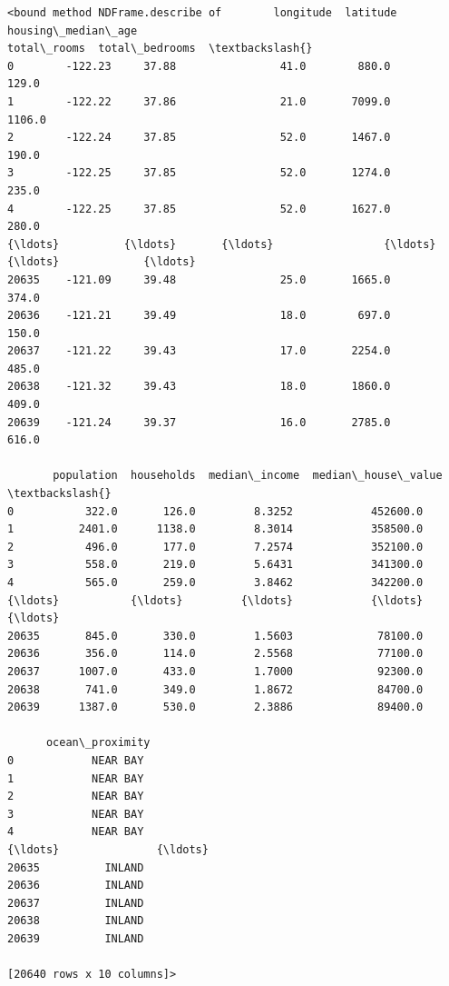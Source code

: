 \documentclass[11pt]{article}
\makeatletter
\newcommand{\boxspacing}{\kern\kvtcb@left@rule\kern\kvtcb@boxsep}
\newcommand{\prompt}[4]{
        {\ttfamily\llap{{\color{#2}[#3]:\hspace{3pt}#4}}\vspace{-\baselineskip}}
    }
\makeatother
\begin{document}
            \begin{tcolorbox}[breakable, size=fbox, boxrule=.5pt, pad at break*=1mm, opacityfill=0]
\prompt{Out}{outcolor}{10}{\boxspacing}
\begin{Verbatim}[commandchars=\\\{\}]
<bound method NDFrame.describe of        longitude  latitude  housing\_median\_age
total\_rooms  total\_bedrooms  \textbackslash{}
0        -122.23     37.88                41.0        880.0           129.0
1        -122.22     37.86                21.0       7099.0          1106.0
2        -122.24     37.85                52.0       1467.0           190.0
3        -122.25     37.85                52.0       1274.0           235.0
4        -122.25     37.85                52.0       1627.0           280.0
{\ldots}          {\ldots}       {\ldots}                 {\ldots}          {\ldots}             {\ldots}
20635    -121.09     39.48                25.0       1665.0           374.0
20636    -121.21     39.49                18.0        697.0           150.0
20637    -121.22     39.43                17.0       2254.0           485.0
20638    -121.32     39.43                18.0       1860.0           409.0
20639    -121.24     39.37                16.0       2785.0           616.0

       population  households  median\_income  median\_house\_value  \textbackslash{}
0           322.0       126.0         8.3252            452600.0
1          2401.0      1138.0         8.3014            358500.0
2           496.0       177.0         7.2574            352100.0
3           558.0       219.0         5.6431            341300.0
4           565.0       259.0         3.8462            342200.0
{\ldots}           {\ldots}         {\ldots}            {\ldots}                 {\ldots}
20635       845.0       330.0         1.5603             78100.0
20636       356.0       114.0         2.5568             77100.0
20637      1007.0       433.0         1.7000             92300.0
20638       741.0       349.0         1.8672             84700.0
20639      1387.0       530.0         2.3886             89400.0

      ocean\_proximity
0            NEAR BAY
1            NEAR BAY
2            NEAR BAY
3            NEAR BAY
4            NEAR BAY
{\ldots}               {\ldots}
20635          INLAND
20636          INLAND
20637          INLAND
20638          INLAND
20639          INLAND

[20640 rows x 10 columns]>
\end{Verbatim}
\end{tcolorbox}
        
\end{document}
